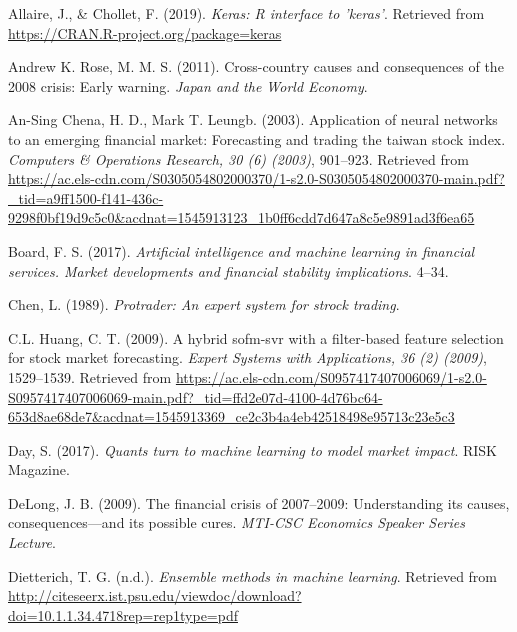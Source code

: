 \documentclass[]{DissertateUSU}
\begin{document}
\setlength{\parindent}{-0.5in}
\setlength{\leftskip}{0.4in}
\setlength{\parskip}{6pt}

\noindent

\hypertarget{refs}{}
\leavevmode\hypertarget{ref-keras}{}%
Allaire, J., \& Chollet, F. (2019). \emph{Keras: R interface to
'keras'}. Retrieved from \url{https://CRAN.R-project.org/package=keras}

\leavevmode\hypertarget{ref-crisisreasons}{}%
Andrew K. Rose, M. M. S. (2011). Cross-country causes and consequences
of the 2008 crisis: Early warning. \emph{Japan and the World Economy}.

\leavevmode\hypertarget{ref-Chen}{}%
An-Sing Chena, H. D., Mark T. Leungb. (2003). Application of neural
networks to an emerging financial market: Forecasting and trading the
taiwan stock index. \emph{Computers \& Operations Research, 30 (6)
(2003)}, 901--923. Retrieved from
\url{https://ac.els-cdn.com/S0305054802000370/1-s2.0-S0305054802000370-main.pdf?_tid=a9ff1500-f141-436c-9298f0bf19d9c5c0\&acdnat=1545913123_1b0ff6cdd7d647a8c5e9891ad3f6ea65}

\leavevmode\hypertarget{ref-AIboard}{}%
Board, F. S. (2017). \emph{Artificial intelligence and machine learning
in financial services. Market developments and financial stability
implications}. 4--34.

\leavevmode\hypertarget{ref-protrader}{}%
Chen, L. (1989). \emph{Protrader: An expert system for strock trading}.

\leavevmode\hypertarget{ref-Huang}{}%
C.L. Huang, C. T. (2009). A hybrid sofm-svr with a filter-based feature
selection for stock market forecasting. \emph{Expert Systems with
Applications, 36 (2) (2009)}, 1529--1539. Retrieved from
\url{https://ac.els-cdn.com/S0957417407006069/1-s2.0-S0957417407006069-main.pdf?_tid=ffd2e07d-4100-4d76bc64-653d8ae68de7\&acdnat=1545913369_ce2c3b4a4eb42518498e95713c23e5c3}

\leavevmode\hypertarget{ref-marketimpact}{}%
Day, S. (2017). \emph{Quants turn to machine learning to model market
impact}. RISK Magazine.

\leavevmode\hypertarget{ref-crisisreasons2}{}%
DeLong, J. B. (2009). The financial crisis of 2007--2009: Understanding
its causes, consequences---and its possible cures. \emph{MTI-CSC
Economics Speaker Series Lecture}.

\leavevmode\hypertarget{ref-ensemble}{}%
Dietterich, T. G. (n.d.). \emph{Ensemble methods in machine learning}.
Retrieved from
\url{http://citeseerx.ist.psu.edu/viewdoc/download?doi=10.1.1.34.4718rep=rep1type=pdf}
\end{document}
